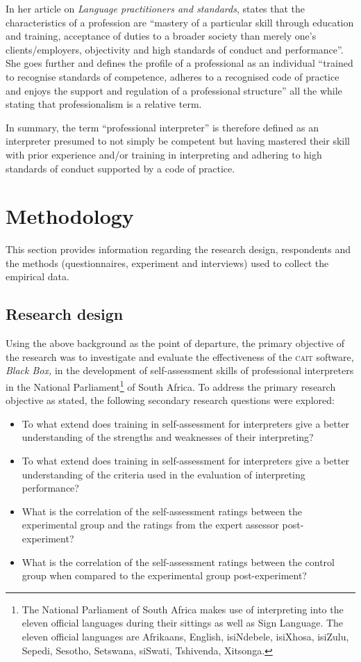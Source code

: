 \documentclass[output=paper]{langsci/langscibook}
\begin{document}
In her article on \textit{Language practitioners and standards}, \citet[162]{Feinauer2005} states that the characteristics of a profession are “mastery of a particular skill through education and training, acceptance of duties to a broader society than merely one’s clients/employers, objectivity and high standards of conduct and performance”. She goes further and defines the profile of a professional as an individual “trained to recognise standards of competence, adheres to a recognised code of practice and enjoys the support and regulation of a professional structure” all the while stating that professionalism is a relative term. 

In summary, the term “professional interpreter” is therefore defined as an interpreter presumed to not simply be competent but having mastered their skill with prior experience and/or training in interpreting and adhering to high standards of conduct supported by a code of practice. 

\section{Methodology}
This section provides information regarding the research design, respondents and the methods (questionnaires, experiment and interviews) used to collect the empirical data. 

\subsection{Research design} 
Using the above background as the point of departure, the primary objective of the research was to investigate and evaluate the effectiveness of the \textsc{cait} software, \textit{Black Box,} in the development of self-assessment skills of professional interpreters in the National Parliament\footnote{The National Parliament of South Africa makes use of interpreting into the eleven official languages during their sittings as well as Sign Language. The eleven official languages are Afrikaans, English, isiNdebele, isiXhosa, isiZulu, Sepedi, Sesotho, Setswana, siSwati, Tshivenda, Xitsonga.}  of South Africa. To address the primary research objective as stated, the following secondary research questions were explored:

\begin{itemize}
\item To what extend does training in self-assessment for interpreters give a better understanding of the strengths and weaknesses of their interpreting?
\item To what extend does training in self-assessment for interpreters give a better understanding of the criteria used in the evaluation of interpreting performance?
\item What is the correlation of the self-assessment ratings between the experimental group and the ratings from the expert assessor post-experiment?
\item What is the correlation of the self-assessment ratings between the control group when compared to the experimental group post-experiment?
\end{itemize}
\end{document}
